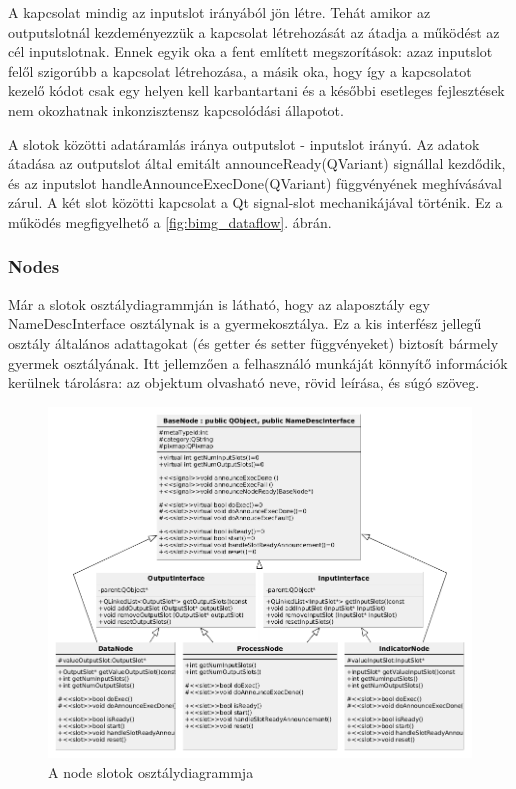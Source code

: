 \documentclass[a4paper,12pt,oneside]{report}
\begin{document}
A kapcsolat mindig az inputslot irányából jön létre. Tehát amikor az outputslotnál kezdeményezzük a kapcsolat létrehozását az átadja a működést az cél inputslotnak. Ennek egyik oka a fent említett megszorítások: azaz inputslot felől szigorúbb a kapcsolat létrehozása, a másik oka, hogy így a kapcsolatot kezelő kódot csak egy helyen kell karbantartani és a későbbi esetleges fejlesztések nem okozhatnak inkonzisztensz kapcsolódási állapotot.

A slotok közötti adatáramlás iránya outputslot - inputslot irányú. Az adatok átadása az outputslot által emitált announceReady(QVariant) signállal kezdődik, és az inputslot handleAnnounceExecDone(QVariant) függvényének meghívásával zárul. A két slot közötti kapcsolat a Qt signal-slot mechanikájával történik. Ez a működés megfigyelhető a \ref{fig:bimg_dataflow}. ábrán.

\subsubsection{Nodes}
Már a slotok osztálydiagrammján is látható, hogy az alaposztály egy NameDescInterface osztálynak is a gyermekosztálya. Ez a kis interfész jellegű osztály általános adattagokat (és getter és setter függvényeket) biztosít bármely gyermek osztályának. Itt jellemzően a felhasználó munkáját könnyítő információk kerülnek tárolásra: az objektum olvasható neve, rövid leírása, és súgó szöveg.

\begin{center}
\begin{figure}[h]
  \includegraphics[width=1.1\textwidth]{node_class_diag.png}
  \caption{A node slotok osztálydiagrammja }

  \label{fig:bimg_slot_diag}
\end{figure}
\end{center}
\end{document}
